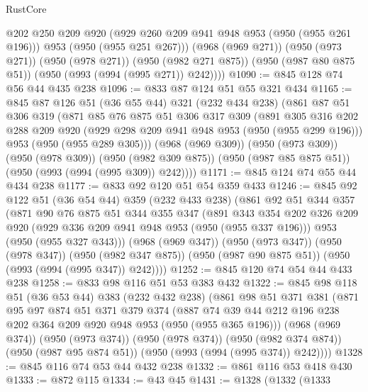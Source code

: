 \begin{lexlean}{RustCore}
\begin{coremodule}
{\begin{coremodule}
{{{{{          @202
          @250
          @209
          @920
          (@929 @260 @209 @941 @948 @953 (@950 (@955 @261 @196)))
          @953
          (@950 (@955 @251 @267)))
        (@968 (@969 @271))
        (@950 (@973 @271))
        (@950 (@978 @271))
        (@950 (@982 @271 @875))
        (@950 (@987 @80 @875 @51))
        (@950 (@993 (@994 (@995 @271)) @242))))
@1090 := @845 @128 @74 @56 @44 @435 @238
@1096 := @833 @87 @124 @51 @55 @321 @434
@1165 := @845
    @87
    @126
    @51
    (@36 @55 @44)
    @321
    (@232 @434 @238)
    (@861
      @87
      @51
      @306
      @319
      (@871
        @85
        @76
        @875
        @51
        @306
        @317
        @309
        (@891
          @305
          @316
          @202
          @288
          @209
          @920
          (@929 @298 @209 @941 @948 @953 (@950 (@955 @299 @196)))
          @953
          (@950 (@955 @289 @305)))
        (@968 (@969 @309))
        (@950 (@973 @309))
        (@950 (@978 @309))
        (@950 (@982 @309 @875))
        (@950 (@987 @85 @875 @51))
        (@950 (@993 (@994 (@995 @309)) @242))))
@1171 := @845 @124 @74 @55 @44 @434 @238
@1177 := @833 @92 @120 @51 @54 @359 @433
@1246 := @845
    @92
    @122
    @51
    (@36 @54 @44)
    @359
    (@232 @433 @238)
    (@861
      @92
      @51
      @344
      @357
      (@871
        @90
        @76
        @875
        @51
        @344
        @355
        @347
        (@891
          @343
          @354
          @202
          @326
          @209
          @920
          (@929 @336 @209 @941 @948 @953 (@950 (@955 @337 @196)))
          @953
          (@950 (@955 @327 @343)))
        (@968 (@969 @347))
        (@950 (@973 @347))
        (@950 (@978 @347))
        (@950 (@982 @347 @875))
        (@950 (@987 @90 @875 @51))
        (@950 (@993 (@994 (@995 @347)) @242))))
@1252 := @845 @120 @74 @54 @44 @433 @238
@1258 := @833 @98 @116 @51 @53 @383 @432
@1322 := @845
    @98
    @118
    @51
    (@36 @53 @44)
    @383
    (@232 @432 @238)
    (@861
      @98
      @51
      @371
      @381
      (@871
        @95
        @97
        @874
        @51
        @371
        @379
        @374
        (@887 @74 @39 @44 @212 @196 @238 @202 @364 @209 @920 @948 @953 (@950 (@955 @365 @196)))
        (@968 (@969 @374))
        (@950 (@973 @374))
        (@950 (@978 @374))
        (@950 (@982 @374 @874))
        (@950 (@987 @95 @874 @51))
        (@950 (@993 (@994 (@995 @374)) @242))))
@1328 := @845 @116 @74 @53 @44 @432 @238
@1332 := @861 @116 @53 @418 @430
@1333 := @872 @115
@1334 := @43 @45
@1431 := @1328
    (@1332
      (@1333
}}}}}
\end{coremodule}}
\end{coremodule}
\end{lexlean}
